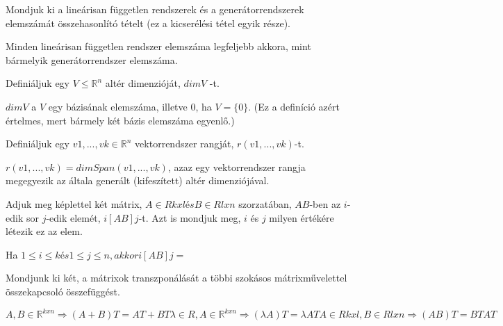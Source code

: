 \begin{frame}
  \begin{tcolorbox}[title={9}]
     Mondjuk ki a lineárisan független rendszerek és a generátorrendszerek elemszámát összehasonlító tételt (ez a kicserélési tétel egyik része).



  \tcblower
Minden lineárisan független rendszer elemszáma legfeljebb akkora, mint bármelyik generátorrendszer elemszáma.

  \end{tcolorbox}
\end{frame}


\begin{frame}
  \begin{tcolorbox}[title={10}]
     Definiáljuk egy $V \leq \mathbb{R}^n$ altér dimenzióját, $dimV$ -t.

  \tcblower
$dimV$ a $V$ egy bázisának elemszáma, illetve 0, ha $V = \{0\}$. (Ez a definíció azért értelmes, mert bármely két bázis elemszáma egyenlő.)

  \end{tcolorbox}
\end{frame}



\begin{frame}
  \begin{tcolorbox}[title={11}]
   Definiáljuk egy $v1,...,vk \in \mathbb{R}^n$ vektorrendszer rangját, $r(v1,...,vk)$-t.


  \tcblower
$r(v1,...,vk) = dimSpan(v1,...,vk)$, azaz egy vektorrendszer rangja megegyezik az általa generált (kifeszített) altér dimenziójával.

  \end{tcolorbox}
\end{frame}


\begin{frame}
  \begin{tcolorbox}[title={12}]
    Adjuk meg képlettel két mátrix, $A \in Rkxl és B \in Rlxn$ szorzatában, $AB$-ben az $i$-edik sor $j$-edik elemét, $i[AB]j$-t. Azt is mondjuk meg, $i$ és $j$ milyen értékére létezik ez az elem.



  \tcblower
Ha $1 \leq i \leq k és 1 \leq j \leq n, akkor i[AB]j =$
  \end{tcolorbox}
\end{frame}



\begin{frame}
  \begin{tcolorbox}[title={13}]
    Mondjunk ki két, a mátrixok transzponálását a többi szokásos mátrixművelettel összekapcsoló összefüggést.

  \tcblower
$A,B \in \mathbb{R}^{k x n} {\Rightarrow} (A + B)T = AT + BT {\lambda} \in R,A \in \mathbb{R}^{k x n} {\Rightarrow} ({\lambda}A)T = {\lambda}AT A \in Rkxl, B \in Rlxn {\Rightarrow} (AB)T = BTAT$

  \end{tcolorbox}
\end{frame}



